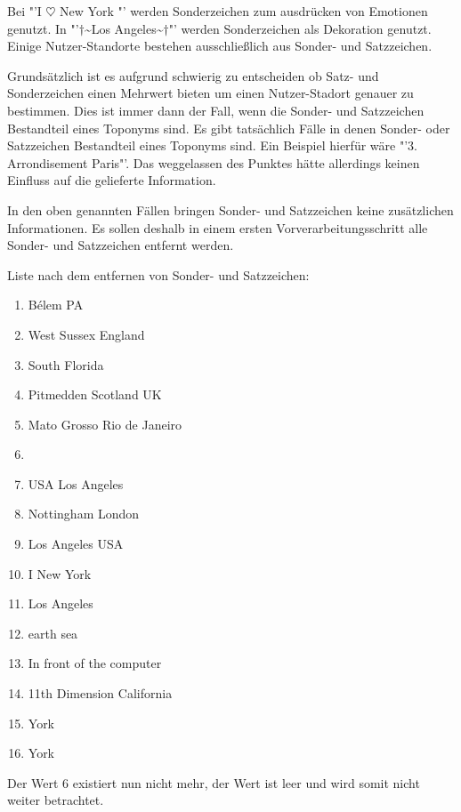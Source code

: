 				Bei "'I $\heartsuit$ New York "' werden Sonderzeichen zum ausdrücken von Emotionen genutzt.
				In "'$\dagger$\textasciitilde Los Angeles\textasciitilde$\dagger$"' werden Sonderzeichen als Dekoration genutzt.
				Einige Nutzer-Standorte bestehen ausschließlich aus Sonder- und Satzzeichen.
				
				Grundsätzlich ist es aufgrund schwierig zu entscheiden ob Satz- und Sonderzeichen einen Mehrwert bieten um einen Nutzer-Stadort genauer zu bestimmen.
				Dies ist immer dann der Fall, wenn die Sonder- und Satzzeichen Bestandteil eines Toponyms sind. 
				Es gibt tatsächlich Fälle in denen Sonder- oder Satzzeichen Bestandteil eines Toponyms sind.
				Ein Beispiel hierfür wäre "'3. Arrondisement Paris"'.
				Das weggelassen des Punktes hätte allerdings keinen Einfluss auf die gelieferte Information.

				In den oben genannten Fällen bringen Sonder- und Satzzeichen keine zusätzlichen Informationen.
				Es sollen deshalb in einem ersten Vorverarbeitungsschritt alle Sonder- und Satzzeichen entfernt werden. 

				Liste nach dem entfernen von Sonder- und Satzzeichen:

				\begin{multicols}{2}
					\begin{enumerate}
						\item Bélem PA
						\item West Sussex England
						\item South Florida
						\item Pitmedden Scotland UK
						\item Mato Grosso Rio de Janeiro
						\item 
						\item USA Los Angeles
						\item Nottingham London
						\item Los Angeles USA
						\item I New York 
						\item Los Angeles
						\item earth sea
						\item In front of the computer
						\item 11th Dimension California
						\item York
						\item York
					\end{enumerate}
				\end{multicols}

				Der Wert 6 existiert nun nicht mehr, der Wert ist leer und wird somit nicht weiter betrachtet.

